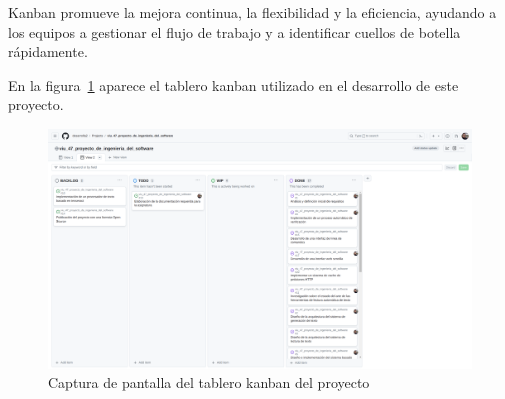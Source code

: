 Kanban promueve la mejora continua, la flexibilidad y la eficiencia, ayudando a los equipos a gestionar el flujo de
trabajo y a identificar cuellos de botella rápidamente.

En la figura~\ref{fig:chapter_3.kanban} aparece el tablero kanban utilizado en el desarrollo de este proyecto.

\begin{figure}[ht]
    \begin{center}
        \includegraphics[width=\textwidth]{./chapter/3/images/chapter_3.kanban}
        \caption{Captura de pantalla del tablero kanban del proyecto}
        \label{fig:chapter_3.kanban}
    \end{center}
\end{figure}